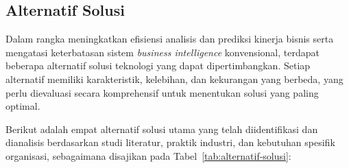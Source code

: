 \subsection{Alternatif Solusi}

Dalam rangka meningkatkan efisiensi analisis dan prediksi kinerja bisnis serta mengatasi keterbatasan sistem \textit{business intelligence} konvensional, terdapat beberapa alternatif solusi teknologi yang dapat dipertimbangkan. Setiap alternatif memiliki karakteristik, kelebihan, dan kekurangan yang berbeda, yang perlu dievaluasi secara komprehensif untuk menentukan solusi yang paling optimal.

Berikut adalah empat alternatif solusi utama yang telah diidentifikasi dan dianalisis berdasarkan studi literatur, praktik industri, dan kebutuhan spesifik organisasi, sebagaimana disajikan pada Tabel~\ref{tab:alternatif-solusi}:

